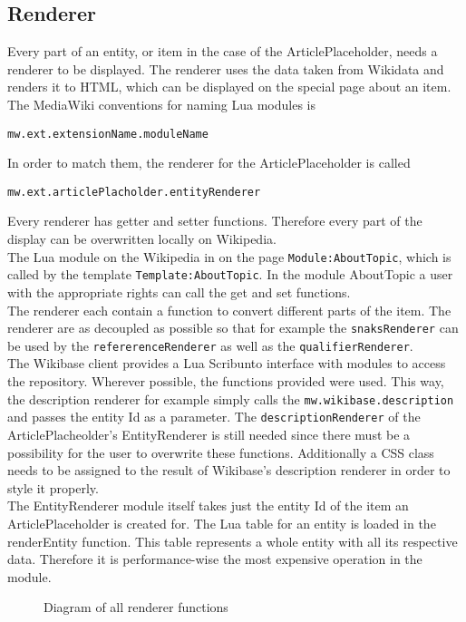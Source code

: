\subsection{Renderer}

Every part of an entity, or item in the case of the ArticlePlaceholder, needs a renderer to be displayed. The renderer uses the data taken from Wikidata and renders it to HTML, which can be displayed on the special page about an item. \\
The MediaWiki conventions for naming Lua modules is 
\begin{center}
\texttt{mw.ext.extensionName.moduleName} 
\end{center}
In order to match them, the renderer for the ArticlePlaceholder is called 
\begin{center}
\texttt{mw.ext.articlePlacholder.entityRenderer}
\end{center}
Every renderer has getter and setter functions. Therefore every part of the display can be overwritten locally on Wikipedia. \\
The Lua module on the Wikipedia in on the page \texttt{Module:AboutTopic}, which is called by the template \texttt{Template:AboutTopic}. In the module AboutTopic a user with the appropriate rights can call the get and set functions. \\
The renderer each contain a function to convert different parts of the item. The renderer are as decoupled as possible so that for example the \texttt{snaksRenderer} can be used by the \texttt{refererenceRenderer} as well as the \texttt{qualifierRenderer}. \\
The Wikibase client provides a Lua Scribunto interface with modules to access the repository. Wherever possible, the functions provided were used. This way, the description renderer for example simply calls the \texttt{mw.wikibase.description} and passes the entity Id as a parameter. The \texttt{descriptionRenderer} of the ArticlePlacheolder's EntityRenderer is still needed since there must be a possibility for the user to overwrite these functions. Additionally a CSS class needs to be assigned to the result of Wikibase's description renderer in order to style it properly. \\
The EntityRenderer module itself takes just the entity Id of the item an ArticlePlaceholder is created for. The Lua table for an entity is loaded in the renderEntity function. This table represents a whole entity with all its respective data. Therefore it is performance-wise the most expensive operation in the module. \\

\begin{figure}[ht]
	\centering
	
	\caption{Diagram of all renderer functions}
	\label{fig:renderer}
\end{figure}

